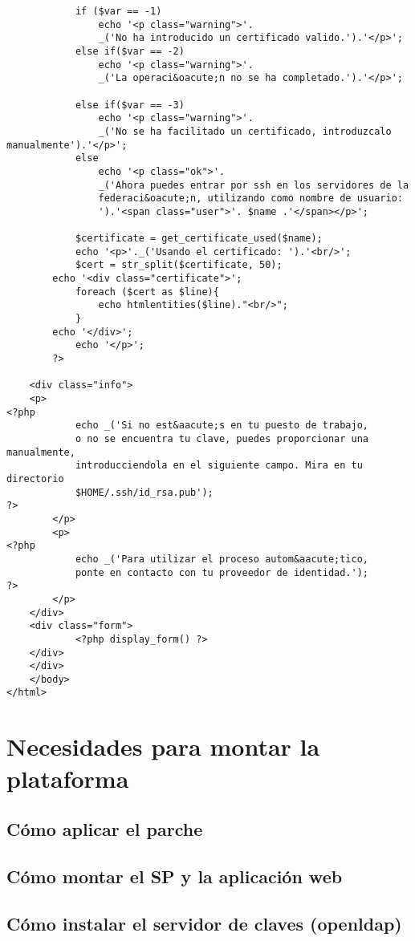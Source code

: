 \begin{lstlisting}
            if ($var == -1)
                echo '<p class="warning">'.
                _('No ha introducido un certificado valido.').'</p>';
            else if($var == -2)
                echo '<p class="warning">'.
                _('La operaci&oacute;n no se ha completado.').'</p>';

            else if($var == -3)
                echo '<p class="warning">'.
                _('No se ha facilitado un certificado, introduzcalo manualmente').'</p>';
            else
                echo '<p class="ok">'.
                _('Ahora puedes entrar por ssh en los servidores de la
                federaci&oacute;n, utilizando como nombre de usuario: 
                ').'<span class="user">'. $name .'</span></p>';
                
            $certificate = get_certificate_used($name);
            echo '<p>'._('Usando el certificado: ').'<br/>';
            $cert = str_split($certificate, 50);
	    echo '<div class="certificate">';
            foreach ($cert as $line){
                echo htmlentities($line)."<br/>";
            }
	    echo '</div>';
            echo '</p>';
        ?>

	<div class="info">
    <p>
<?php
            echo _('Si no est&aacute;s en tu puesto de trabajo,
            o no se encuentra tu clave, puedes proporcionar una manualmente,
            introducciendola en el siguiente campo. Mira en tu directorio
            $HOME/.ssh/id_rsa.pub');
?>
        </p>
        <p>
<?php
            echo _('Para utilizar el proceso autom&aacute;tico,
            ponte en contacto con tu proveedor de identidad.');
?>
        </p>
	</div>
	<div class="form">
            <?php display_form() ?>
	</div>
	</div>
    </body>
</html>

    \end{lstlisting}
    

    \section{Necesidades para montar la plataforma}
        \subsection{Cómo aplicar el parche}
        \subsection{Cómo montar el SP y la aplicación web}
        \subsection{Cómo instalar el servidor de claves (openldap)}
